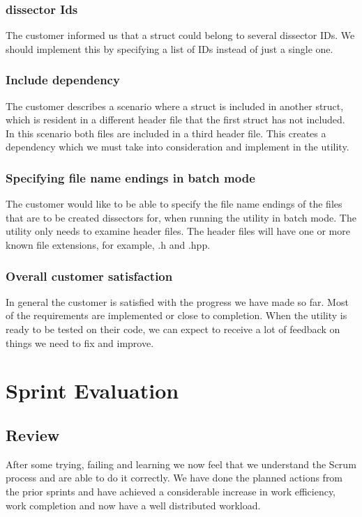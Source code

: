\subsubsection{\Gls{dissector} Ids}

The customer informed us that a \gls{struct} could belong to several \gls{dissector} IDs.
We should implement this by specifying a list of IDs instead of just a single one.

\subsubsection{Include dependency}

The customer describes a scenario where a \gls{struct} is included in another \gls{struct}, which is resident in a different \gls{header} file
that the first \gls{struct} has not included. In this scenario both files are included in a third \gls{header} file.
This creates a dependency which we must take into consideration and implement in the \gls{utility}.

\subsubsection{Specifying file name endings in \gls{batch mode}}

The customer would like to be able to specify the file name endings of the files that are to be created \glspl{dissector} for,
when running the \gls{utility} in \gls{batch mode}. The \gls{utility} only needs to examine \gls{header} files. The \gls{header} files will have one or more known
file extensions, for example, .h and .hpp.

\subsubsection{Overall customer satisfaction}

In general the customer is satisfied with the progress we have made so far. Most of the requirements are
implemented or close to completion. When the \gls{utility} is ready to be tested on their code, we can expect to receive
a lot of feedback on things we need to fix and improve.

\section{Sprint Evaluation}

\subsection{Review}
After some trying, failing and learning we now feel that we understand the Scrum process and are able to do it correctly. We have done the planned actions from the prior sprints and have achieved a considerable increase in work efficiency, work completion and now have a well distributed workload. 

